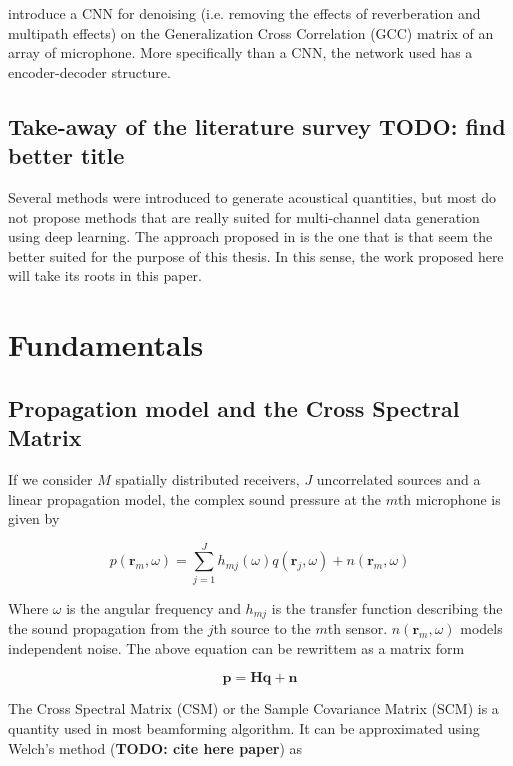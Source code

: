 \documentclass[11pt,a4paper,twoside]{report}
\begin{document}
\cite{vera2021acoustic} introduce a CNN for denoising (i.e. removing the effects of reverberation and multipath effects) on the Generalization Cross Correlation (GCC) matrix of an array of microphone. More specifically than a CNN, the network used has a encoder-decoder structure.

\subsection{Take-away of the literature survey  TODO: find better title}

Several methods were introduced to generate acoustical quantities, but most do not propose methods that are really suited for multi-channel data generation using deep learning. The approach proposed in \cite{gerstoft2020parametric} is the one that is that seem the better suited for the purpose of this thesis. In this sense, the work proposed here will take its roots in this paper. 

\section{Fundamentals}

\subsection{Propagation model and the Cross Spectral Matrix}

If we consider $M$ spatially distributed receivers, $J$ uncorrelated sources and a linear propagation model, the complex sound pressure at the $m$th microphone is given by

\begin{equation}
    p(\mathbf{r}_m, \omega) = \sum_{j = 1}^{J} h_{mj}(\omega)q(\mathbf{r}_j, \omega) + n(\mathbf{r}_m, \omega)
\end{equation}

Where $\omega$ is the angular frequency and $h_{mj}$ is the transfer function  describing the  the sound propagation from the $j$th source to the $m$th sensor. $n(\mathbf{r}_m, \omega)$ models independent noise. The above equation can be rewrittem as a matrix form

\begin{equation}
    \mathbf{p} = \mathbf{H} \mathbf{q} + \mathbf{n}
\end{equation}

The Cross Spectral Matrix (CSM) or the Sample Covariance Matrix (SCM) is a quantity used in most beamforming algorithm. It can be approximated using Welch's method (\textbf{TODO: cite here paper}) as
\end{document}
